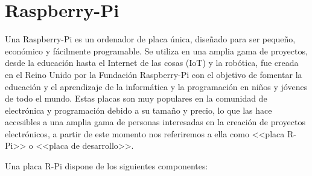 \section{Raspberry-Pi}

Una Raspberry-Pi es un ordenador de placa única, diseñado para ser pequeño, económico y fácilmente programable. Se utiliza en una amplia gama de proyectos, desde la educación hasta el Internet de las cosas (IoT) y la robótica, fue creada en el Reino Unido por la Fundación Raspberry-Pi con el objetivo de fomentar la educación y el aprendizaje de la informática y la programación en niños y jóvenes de todo el mundo. Estas placas son muy populares en la comunidad de electrónica y programación debido a su tamaño y precio, lo que las hace accesibles a una amplia gama de personas interesadas en la creación de proyectos electrónicos, a partir de este momento nos referiremos a ella como <<placa R-Pi>> o <<placa de desarrollo>>.

Una placa R-Pi dispone de los siguientes componentes:

